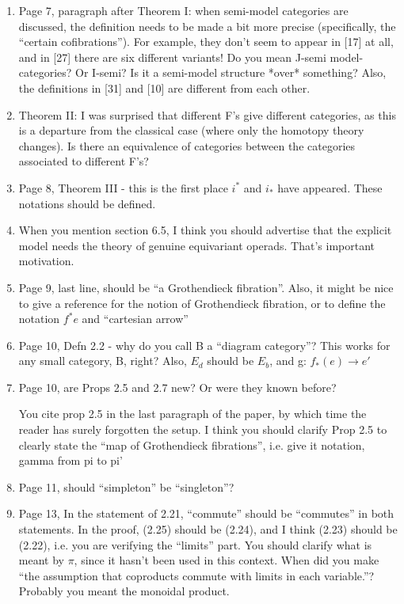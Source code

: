 \documentclass{article}
\begin{document}
\begin{enumerate}
\item
Page 7, paragraph after Theorem I: when semi-model categories are discussed, the definition needs to be made a bit more precise (specifically, the ``certain cofibrations''). For example, they don't seem to appear in [17] at all, and in [27] there are six different variants! Do you mean J-semi model-categories? Or I-semi? Is it a semi-model structure *over* something? Also, the definitions in [31] and [10] are different from each other.

\item
Theorem II: I was surprised that different F's give different categories, as this is a departure from the classical case (where only the homotopy theory changes). Is there an equivalence of categories between the categories associated to different F's?

\item
Page 8, Theorem III - this is the first place $i^*$ and $i_*$ have appeared. These notations should be defined.

\item
When you mention section 6.5, I think you should advertise that the explicit model needs the theory of genuine equivariant operads. That's important motivation.

\item
Page 9, last line, should be ``a Grothendieck fibration''. Also, it might be nice to give a reference for the notion of Grothendieck fibration, or to define the notation $f^*e$ and ``cartesian arrow''

\item
Page 10, Defn 2.2 - why do you call B a ``diagram category''? This works for any small category, B, right? Also, $E_d$ should be $E_b$, and g: $f_*(e) \to e'$

\item
Page 10, are Props 2.5 and 2.7 new? Or were they known before?

You cite prop 2.5 in the last paragraph of the paper, by which time the reader has surely forgotten the setup. I think you should clarify Prop 2.5 to clearly state the ``map of Grothendieck fibrations'', i.e. give it notation, gamma from pi to pi'

\item
Page 11, should ``simpleton'' be ``singleton''?

\item
Page 13, In the statement of 2.21, ``commute'' should be ``commutes'' in both statements.
In the proof, (2.25) should be (2.24), and I think (2.23) should be (2.22), i.e. you are verifying the ``limits'' part. 
You should clarify what is meant by $\pi$, since it hasn't been used in this context.
When did you make ``the assumption that coproducts commute with limits in each variable.''? Probably you meant the monoidal product.


\end{enumerate}
\end{document}
